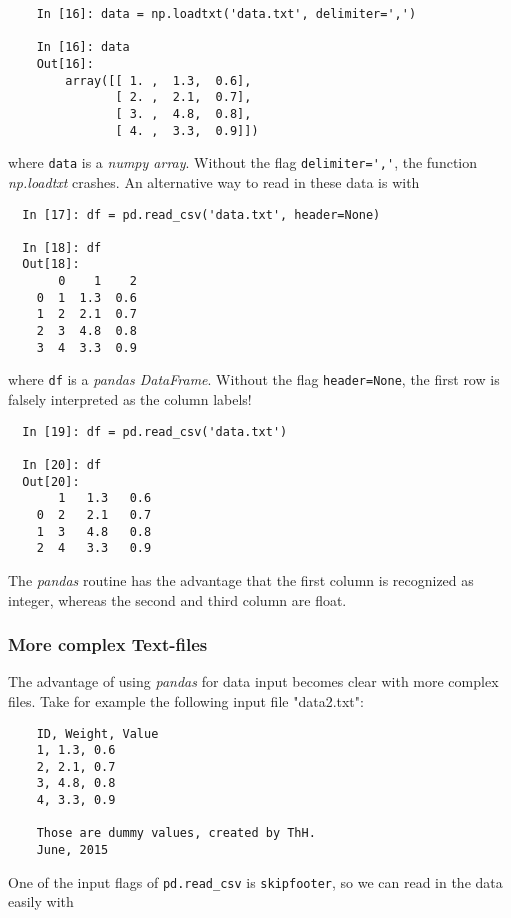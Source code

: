 \begin{lstlisting}
    In [16]: data = np.loadtxt('data.txt', delimiter=',')

    In [16]: data
    Out[16]:
        array([[ 1. ,  1.3,  0.6],
               [ 2. ,  2.1,  0.7],
               [ 3. ,  4.8,  0.8],
               [ 4. ,  3.3,  0.9]])
\end{lstlisting}

where \lstinline{data} is a \emph{numpy array}. Without the flag \lstinline{delimiter=','}, the function \emph{np.loadtxt} crashes. An alternative way to read in these data is with

\begin{lstlisting}
  In [17]: df = pd.read_csv('data.txt', header=None)
  
  In [18]: df
  Out[18]:
       0    1    2
    0  1  1.3  0.6
    1  2  2.1  0.7
    2  3  4.8  0.8
    3  4  3.3  0.9
\end{lstlisting}

where \lstinline{df} is a \emph{pandas DataFrame}. Without the flag \lstinline{header=None}, the first row is falsely interpreted as the column labels!

\begin{lstlisting}
  In [19]: df = pd.read_csv('data.txt')

  In [20]: df
  Out[20]:
       1   1.3   0.6
    0  2   2.1   0.7
    1  3   4.8   0.8
    2  4   3.3   0.9
\end{lstlisting}
 
 The \emph{pandas} routine has the advantage that the first column is recognized as integer, whereas the second and third column are float.

\subsubsection{More complex Text-files}

The advantage of using \emph{pandas} for data input becomes clear with more complex files. Take for example the following input file "data2.txt":

\begin{lstlisting}
    ID, Weight, Value
    1, 1.3, 0.6
    2, 2.1, 0.7
    3, 4.8, 0.8
    4, 3.3, 0.9

    Those are dummy values, created by ThH.
    June, 2015
\end{lstlisting}

One of the input flags of \lstinline{pd.read_csv} is \lstinline{skipfooter}, so we can read in the data easily with

